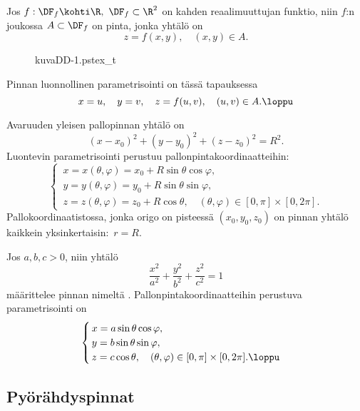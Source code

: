 \begin{Exa} Jos $f: \DF_f \kohti \R,\ \DF_f \subset \R^2$ on kahden reaalimuuttujan funktio,
niin $f$:n  joukossa $A\subset\DF_f$ on pinta, jonka yhtälö on
\[
z=f(x,y),\quad (x,y)\in A.
\]
\begin{figure}[H]
\begin{center}
{kuvaDD-1.pstex_t}
\end{center}
\end{figure}
Pinnan luonnollinen parametrisointi on tässä tapauksessa
\[
x=u,\quad y=v,\quad z=f(u,v), \quad (u,v) \in A. \loppu 
 \]
\end{Exa}
\begin{Exa} Avaruuden yleisen pallopinnan yhtälö on
\[ 
(x-x_0)^2 + (y-y_0)^2 + (z-z_0)^2 = R^2. 
\]
Luontevin parametrisointi perustuu pallonpintakoordinaatteihin:
\[ \begin{cases} \,x = x(\theta,\varphi) = x_0 + R \sin \theta \cos \varphi, \\
                 \,y = y(\theta,\varphi) = y_0 + R \sin \theta \sin \varphi, \\
                 \,z = z(\theta,\varphi) 
                   = z_0 + R \cos \theta, \quad (\theta,\varphi) \in [0,\pi] \times [0,2\pi].
   \end{cases} \]
Pallokoordinaatistossa, jonka origo on pisteessä $(x_0,y_0,z_0)$ on pinnan yhtälö kaikkein 
yksinkertaisin: $\,r = R$. \loppu \end{Exa}
\begin{Exa} Jos $a,b,c>0$, niin yhtälö
\[ 
\frac{x^2}{a^2} + \frac{y^2}{b^2} + \frac{z^2}{c^2} = 1 
\]
määrittelee pinnan nimeltä
%
. Pallonpintakoordinaatteihin perustuva parametrisointi on
\[ \begin{cases} 
     \,x = a \sin \theta \cos \varphi, \\ 
     \,y = b \sin \theta \sin \varphi, \\ 
     \,z = c \cos \theta, \quad (\theta,\varphi) \in [0,\pi] \times [0,2\pi]. \loppu
   \end{cases} \]
\end{Exa}

\subsection*{Pyörähdyspinnat}

